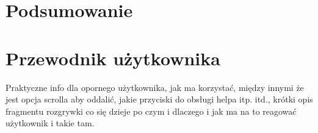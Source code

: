 \documentclass[11pt,a4paper,polish,thesis]{dcsbook}
\begin{document}
	
	\chapter{Podsumowanie}
	
	\appendix
	
	\chapter{Przewodnik użytkownika}
	
	Praktyczne info dla opornego użytkownika, jak ma korzystać, między innymi że jest opcja scrolla aby oddalić, jakie przyciski do obsługi helpa itp. itd., krótki opis fragmentu rozgrywki co się dzieje po czym i dlaczego i jak ma na to reagować użytkownik i takie tam.
	
	\backmatter
	
\end{document}
